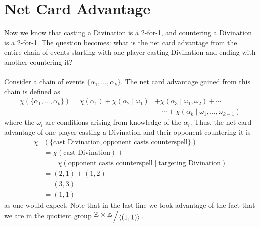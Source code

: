 \documentclass[1pt]{report}
\newcommand{\Z}{\mathbb{Z}}
\newcommand{\<}{\langle}
\renewcommand{\>}{\rangle}
\newcommand{\quot}[2]{{\raisebox{.2em}{$#1$}\left/\raisebox{-.2em}{$#2$}\right.}}
\begin{document}
\section{Net Card Advantage}
Now we know that casting a Divination is a 2-for-1, and countering a Divination is a 2-for-1. The question becomes: what is the net card advantage from the entire chain of events starting with one player casting Divination and ending with another countering it? \\
\\
Consider a chain of events $\{\alpha_1, \dots, \alpha_k\}$. The net card advantage gained from this chain is defined as
\begin{align*}
\chi(\{\alpha_1, \dots ,\alpha_k\}) = \chi(\alpha_1) + \chi(\alpha_2 \mid \omega_1) &+ \chi(\alpha_3 \mid \omega_1, \omega_2) + \cdots \\
& \quad \cdots + \chi(\alpha_k \mid \omega_1, \dots, \omega_{k-1})
\end{align*} 
where the $\omega_i$ are conditions arising from knowledge of the $\alpha_i$. Thus, the net card advantage of one player casting a Divination and their opponent countering it is
\begin{align*}
\chi&(\{\text{cast Divination}, \text{opponent casts counterspell}\}) \\
&= \chi(\text{cast Divination}) + \\
& \qquad \chi(\text{opponent casts counterspell} \mid \text{targeting Divination})\\
& = (2,1) + (1,2)\\
& = (3,3)\\
& = (1,1)
\end{align*}
as one would expect. Note that in the last line we took advantage of the fact that we are in the quotient group $\quot{\Z\times\Z}{\langle(1,1)\rangle}$.
\end{document}
